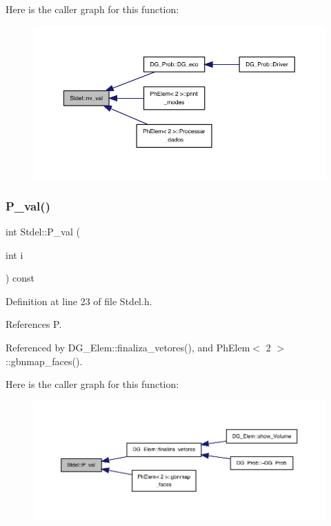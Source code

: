 Here is the caller graph for this function\+:
\nopagebreak
\begin{figure}[H]
\begin{center}
\leavevmode
\includegraphics[width=350pt]{classStdel_ae2ab461d1bc8d9f6006665fe03684845_icgraph}
\end{center}
\end{figure}
\mbox{\label{classStdel_a701c7d5595d4f6632333c4202898983b}} 
\subsubsection{\texorpdfstring{P\+\_\+val()}{P\_val()}}
{\footnotesize\ttfamily int Stdel\+::\+P\+\_\+val (\begin{DoxyParamCaption}\item[{int}]{i }\end{DoxyParamCaption}) const\hspace{0.3cm}{\ttfamily [inline]}}



Definition at line 23 of file Stdel.\+h.



References P.



Referenced by D\+G\+\_\+\+Elem\+::finaliza\+\_\+vetores(), and Ph\+Elem$<$ 2 $>$\+::gbnmap\+\_\+faces().

Here is the caller graph for this function\+:
\nopagebreak
\begin{figure}[H]
\begin{center}
\leavevmode
\includegraphics[width=350pt]{classStdel_a701c7d5595d4f6632333c4202898983b_icgraph}
\end{center}
\end{figure}
\mbox{\label{classStdel_a9a0c69dca7564f6ca4aa4f3c9864ea01}} 
